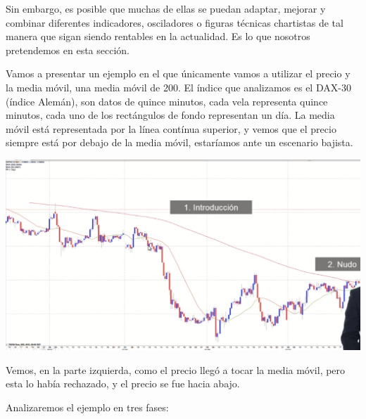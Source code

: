 Sin embargo, es posible que muchas de ellas se puedan adaptar, mejorar y combinar diferentes indicadores, osciladores o figuras técnicas chartistas de tal manera que sigan siendo rentables en la actualidad. Es lo que nosotros pretendemos en esta sección.

Vamos a presentar un ejemplo en el que únicamente vamos a utilizar el precio y la media móvil, una media móvil de 200. El índice que analizamos es el DAX-30 (índice Alemán), son datos de quince minutos, cada vela representa quince minutos, cada uno de los rectángulos de fondo representan un día. La media móvil está representada por la línea contínua superior, y vemos que el precio siempre está por debajo de la media móvil, estaríamos ante un escenario bajista.
\begin{center}
    \includegraphics[scale=.65]{images/mod03-22.png}
\end{center}
Vemos, en la parte izquierda, como el precio llegó a tocar la media móvil, pero esta lo había rechazado, y el precio se fue hacia abajo.

Analizaremos el ejemplo en tres fases:

